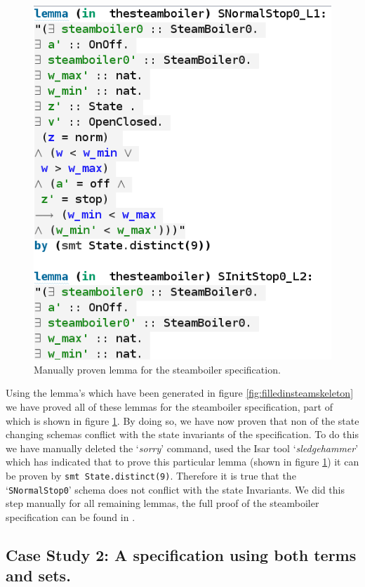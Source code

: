\begin{figure}[H]
\includegraphics[scale=0.5]{Figures/Evaluation/6image.png}
\caption{Manually proven lemma for the steamboiler specification. \label{fig:steamboilerproof}}
\end{figure}

Using the lemma's which have been generated in figure \ref{fig:filledinsteamskeleton} we have proved all of these lemmas for the steamboiler specification, part of which is shown in figure \ref{fig:steamboilerproof}. By doing so, we have now proven that non of the state changing schemas conflict with the state invariants of the specification. To do this we have manually deleted the `\emph{sorry}' command, used the Isar tool `\emph{sledgehammer}' which has indicated that to prove this particular lemma (shown in figure \ref{fig:steamboilerproof}) it can be proven by \verb|smt State.distinct(9)|. Therefore it is true that the `\texttt{SNormalStop0}' schema does not conflict with the state Invariants. We did this step manually for all remaining lemmas, the full proof of the steamboiler specification can be found in \cite{mathlangexamples}.

\subsection{Case Study 2: A specification using both terms and sets.}

